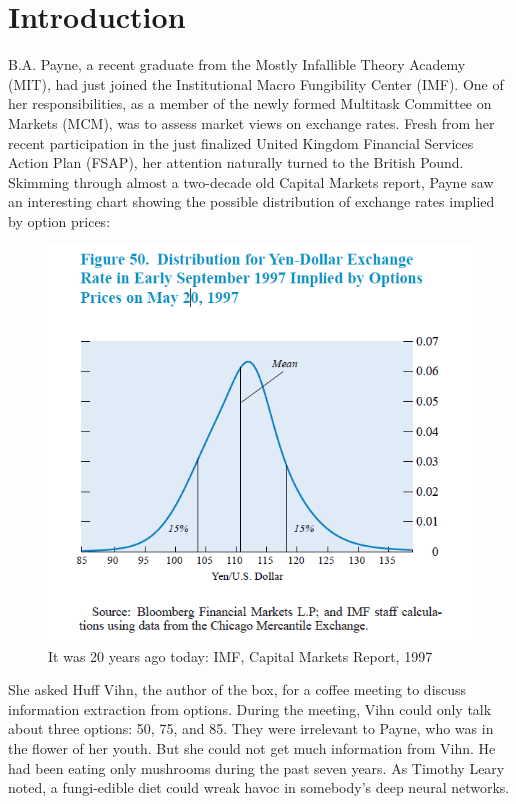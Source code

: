 \documentclass[]{book}
\theoremstyle{definition}
\theoremstyle{definition}
\theoremstyle{definition}
\theoremstyle{remark}
\begin{document}
\chapter{Introduction}\label{intro}

B.A. Payne, a recent graduate from the Mostly Infallible Theory Academy
(MIT), had just joined the Institutional Macro Fungibility Center (IMF).
One of her responsibilities, as a member of the newly formed Multitask
Committee on Markets (MCM), was to assess market views on exchange
rates. Fresh from her recent participation in the just finalized United
Kingdom Financial Services Action Plan (FSAP), her attention naturally
turned to the British Pound. Skimming through almost a two-decade old
Capital Markets report, Payne saw an interesting chart showing the
possible distribution of exchange rates implied by option prices:

\begin{figure}

{\centering \includegraphics[width=0.8\linewidth]{images/figJPYRND} 

}

\caption{It was 20 years ago today: IMF, Capital Markets Report, 1997}\label{fig:fig-CMReport}
\end{figure}

She asked Huff Vihn, the author of the box, for a coffee meeting to
discuss information extraction from options. During the meeting, Vihn
could only talk about three options: 50, 75, and 85. They were
irrelevant to Payne, who was in the flower of her youth. But she could
not get much information from Vihn. He had been eating only mushrooms
during the past seven years. As Timothy Leary noted, a fungi-edible diet
could wreak havoc in somebody's deep neural networks.
\end{document}
